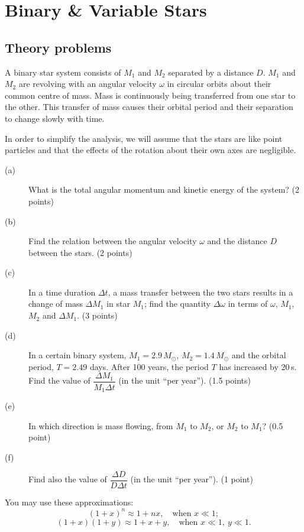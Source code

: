 \chapter{Binary \& Variable Stars}

\section*{Theory problems}

A binary star system consists of $M_1$ and $M_2$ separated by a distance $D$.
$M_1$ and $M_2$ are revolving with an angular velocity $\omega$ in circular
orbits about their common centre of mass. Mass is continuously being
transferred from one star to the other. This transfer of mass causes their
orbital period and their separation to change slowly with time.

In order to simplify the analysis, we will assume that the stars are like
point particles and that the effects of the rotation about their own axes are
negligible.

\begin{description}
\item[(a)] What is the total angular momentum and kinetic energy of the
  system? \hfill(2 points)
\item[(b)] Find the relation between the angular velocity $\omega$ and the
  distance $D$ between the stars. \hfill(2 points)
\item[(c)] In a time duration $\Delta t$, a mass transfer between the two
  stars results in a change of mass $\Delta M_1$ in star $M_1$; find the
  quantity $\Delta\omega$ in terms of $\omega$, $M_1$, $M_2$ and
  $\Delta M_1$. \hfill(3 points)
\item[(d)] In a certain binary system, $M_1 = 2.9\,M_\odot$,
  $M_2 = 1.4\,M_\odot$ and the orbital period, $T = 2.49$ days. After 100
  years, the period $T$ has increased by 20\,s. Find the value of
  $\dfrac{\Delta M_1}{M_1 \Delta t}$ (in the unit ``per year'').
  \hfill(1.5 points)
\item[(e)] In which direction is mass flowing, from $M_1$ to $M_2$, or $M_2$
  to $M_1$? \hfill(0.5 point)
\item[(f)] Find also the value of $\dfrac{\Delta D}{D \Delta t}$ (in the
  unit ``per year''). \hfill(1 point)
\end{description}

You may use these approximations:
\[ (1+x)^n \approx 1 + nx, \quad \mbox{when } x \ll 1; \]
\[ (1+x)(1+y) \approx 1 + x + y, \quad \mbox{when } x \ll 1,\ y \ll 1. \]

